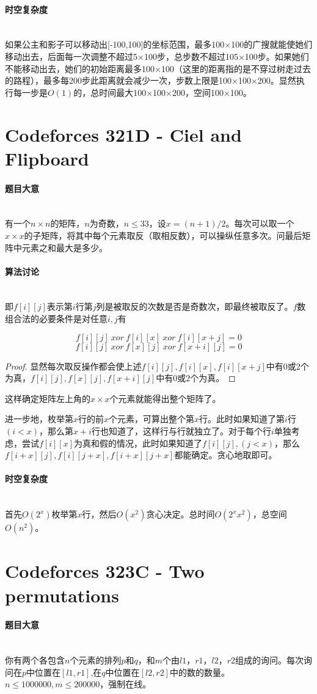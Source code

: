 \documentclass[UTF8]{ctexart}
\newcommand{\myparagraph}[1]{\paragraph{#1}\mbox{}\\}
\theoremstyle{nonumberplain}
\newtheorem{proof}{\hspace{1em}证明：}
\begin{document}
		\myparagraph{时空复杂度}
			
			如果公主和影子可以移动出[-100,100]的坐标范围，最多100×100的广搜就能使她们移动出去，后面每一次调整不超过5×100步，总步数不超过105×100步。如果她们不能移动出去，她们的初始距离最多100×100（这里的距离指的是不穿过树走过去的路程），最多每200步此距离就会减少一次，步数上限是100×100×200。显然执行每一步是$O(1)$的，总时间最大100×100×200，空间100×100。
	
	\section{Codeforces 321D - Ciel and Flipboard}
	
		\myparagraph{题目大意}
		
			有一个$n \times n$的矩阵，$n$为奇数，$n \leq 33$，设$x=(n+1)/2$。每次可以取一个$x \times x$的子矩阵，将其中每个元素取反（取相反数），可以操纵任意多次。问最后矩阵中元素之和最大是多少。
			
		\myparagraph{算法讨论}
		
			即$f[i][j]$表示第$i$行第$j$列是被取反的次数是否是奇数次，即最终被取反了。$f$数组合法的必要条件是对任意$i,j$有
			
			$$f[i][j]\ xor\ f[i][x]\ xor\ f[i][x+j]=0$$
			$$f[i][j]\ xor\ f[x][j]\ xor\ f[x+i][j]=0$$
			
			\begin{proof}显然每次取反操作都会使上述$f[i][j],f[i][x],f[i][x+j]$中有0或2个为真，$f[i][j],f[x][j],f[x+i][j]$中有0或2个为真。\end{proof}
			
			这样确定矩阵左上角的$x \times x$个元素就能得出整个矩阵了。
			
			进一步地，枚举第$x$行的前$x$个元素，可算出整个第$x$行。此时如果知道了第$i$行$(i<x)$，那么第$x+i$行也知道了，这样行与行就独立了。对于每个行$i$单独考虑，尝试$f[i][x]$为真和假的情况，此时如果知道了$f[i][j],(j<x)$，那么$f[i+x][j],f[i][j+x],f[i+x][j+x]$都能确定。贪心地取即可。
	
		\myparagraph{时空复杂度}
		
			首先$O(2^x)$枚举第$x$行，然后$O(x^2)$贪心决定。总时间$O(2^xx^2)$，总空间$O(n^2)$。
		
	\section{Codeforces 323C - Two permutations}
	
		\myparagraph{题目大意}
		
			你有两个各包含$n$个元素的排列$p$和$q$，和$m$个由$l1$，$r1$，$l2$，$r2$组成的询问。每次询问在$p$中位置在$[l1,r1]$,在$q$中位置在$[l2,r2]$中的数的数量。$n \leq 1000000, m \leq 200000$，强制在线。
			
\end{document}
